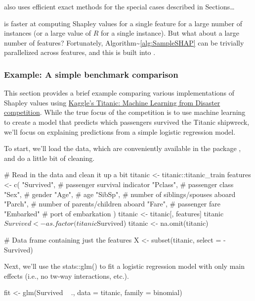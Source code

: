  also uses efficient exact methods for the special cases
described in Sections\ldots{}

 is faster at computing Shapley values for a single
feature for a large number of instances (or a large value of \(R\) for a
single instance). But what about a large number of features?
Fortunately, Algorithm\textasciitilde{}\ref{alg:SampleSHAP} can be
trivially parallelized across features, and this is built into
.

\hypertarget{example-a-simple-benchmark-comparison}{%
\subsubsection{Example: A simple benchmark
comparison}\label{example-a-simple-benchmark-comparison}}

This section provides a brief example comparing various implementations
of Shapley values using \href{https://www.kaggle.com/c/titanic}{Kaggle's
Titanic: Machine Learning from Disaster competition}. While the true
focus of the competition is to use machine learning to create a model
that predicts which passengers survived the Titanic shipwreck, we'll
focus on explaining predictions from a simple logistic regression model.

To start, we'll load the data, which are conveniently available in the
 package \citep{R-titanic}, and do a little bit of
cleaning.

\begin{Schunk}
\begin{Sinput}
# Read in the data and clean it up a bit
titanic <- titanic::titanic_train
features <- c(
  "Survived",  # passenger survival indicator
  "Pclass",    # passenger class
  "Sex",       # gender
  "Age",       # age
  "SibSp",     # number of siblings/spouses aboard
  "Parch",     # number of parents/children aboard
  "Fare",      # passenger fare
  "Embarked"   # port of embarkation
)
titanic <- titanic[, features]
titanic$Survived <- as.factor(titanic$Survived)
titanic <- na.omit(titanic)

# Data frame containing just the features
X <- subset(titanic, select = -Survived)
\end{Sinput}
\end{Schunk}

Next, we'll use the stats::glm() to fit a logistic regression model with
only main effects (i.e., no tw-way interactions, etc.).

\begin{Schunk}
\begin{Sinput}
fit <- glm(Survived ~ ., data = titanic, family = binomial)
\end{Sinput}
\end{Schunk}

